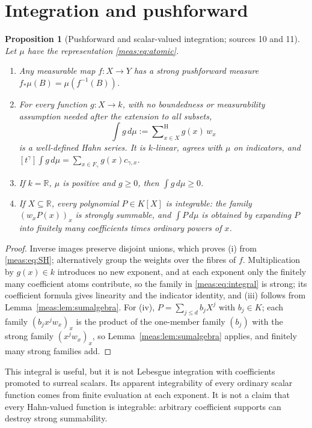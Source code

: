 \documentclass[11pt]{article}
\numberwithin{equation}{section}
\newtheorem{proposition}[theorem]{Proposition}
\theoremstyle{definition}
\theoremstyle{remark}
\newcommand{\R}{\mathbb R}
\newcommand{\coef}[2]{[t^{#1}]#2}
\newcommand{\hsum}{\mathop{\sum}\nolimits^{\mathrm H}}
\begin{document}
\section{Integration and pushforward}\label{meas:sec:integration}

\begin{proposition}[Pushforward and scalar-valued integration; sources 10
and 11]\label{meas:prop:integration}
Let $\mu$ have the representation \eqref{meas:eq:atomic}.
\begin{enumerate}[label=(\roman*)]
\item Any measurable map $f:X\to Y$ has a strong pushforward measure
$f_*\mu(B)=\mu(f^{-1}(B))$.
\item For every function $g:X\to k$, with no boundedness or measurability
assumption needed after the extension to all subsets,
\begin{equation}\label{meas:eq:integral}
 \int g\,d\mu:=\hsum_{x\in X}g(x)\,w_x
\end{equation}
is a well-defined Hahn series. It is $k$-linear, agrees with $\mu$ on
indicators, and $\coef{\gamma}{\int g\,d\mu}=\sum_{x\in F_\gamma}g(x)c_{\gamma,x}$.
\item If $k=\R$, $\mu$ is positive and $g\ge0$, then $\int g\,d\mu\ge0$.
\item If $X\subseteq\R$, every polynomial $P\in K[X]$ is integrable: the family
$(w_xP(x))_x$ is strongly summable, and $\int P\,d\mu$ is obtained by expanding
$P$ into finitely many coefficients times ordinary powers of $x$.
\end{enumerate}
\end{proposition}
\begin{proof}
Inverse images preserve disjoint unions, which proves (i) from
\eqref{meas:eq:SH}; alternatively group the weights over the fibres of $f$.
Multiplication by $g(x)\in k$ introduces no new exponent, and at each exponent
only the finitely many coefficient atoms contribute, so the family in
\eqref{meas:eq:integral} is strong; its coefficient formula gives linearity and
the indicator identity, and (iii) follows from
Lemma~\ref{meas:lem:sumalgebra}. For (iv), $P=\sum_{j\le d}b_jX^j$ with
$b_j\in K$; each family $(b_jx^jw_x)_x$ is the product of the one-member family
$(b_j)$ with the strong family $(x^jw_x)_x$, so Lemma~\ref{meas:lem:sumalgebra}
applies, and finitely many strong families add.
\end{proof}

This integral is useful, but it is not Lebesgue integration with coefficients
promoted to surreal scalars. Its apparent integrability of every ordinary
scalar function comes from finite evaluation at each exponent. It is not a
claim that every Hahn-valued function is integrable: arbitrary coefficient
supports can destroy strong summability.
\end{document}
